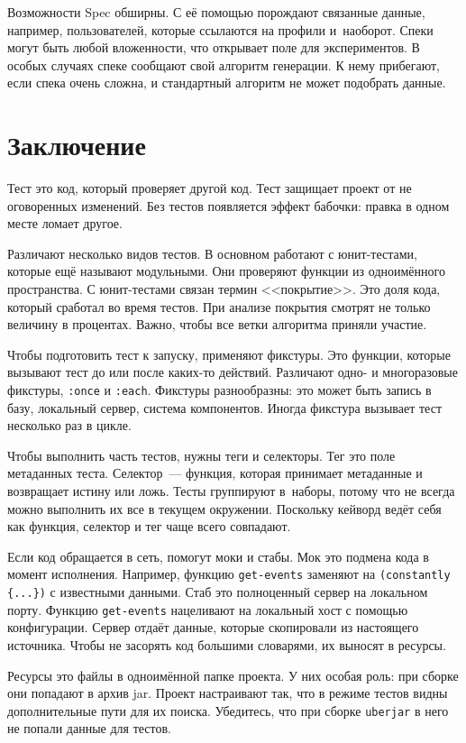 Возможности Spec обширны. С её помощью порождают связанные данные, например,
пользователей, которые ссылаются на профили и~наоборот. Спеки могут быть любой
вложенности, что открывает поле для экспериментов. В особых случаях спеке
сообщают свой алгоритм генерации. К нему прибегают, если спека очень сложна, и
стандартный алгоритм не может подобрать данные.

\section{Заключение}

Тест это код, который проверяет другой код. Тест защищает проект от не
оговоренных изменений. Без тестов появляется эффект бабочки: правка в одном
месте ломает другое.


Различают несколько видов тестов. В основном работают с юнит-тестами, которые
ещё называют модульными. Они проверяют функции из одноимённого пространства. С
юнит-тестами связан термин <<покрытие>>. Это доля кода, который сработал во
время тестов. При анализе покрытия смотрят не только величину в
процентах. Важно, чтобы все ветки алгоритма приняли участие.

Чтобы подготовить тест к запуску, применяют фикстуры. Это функции, которые
вызывают тест до или после каких-то действий. Различают одно- и многоразовые
фикстуры, \verb|:once| и \verb|:each|. Фикстуры разнообразны: это может быть
запись в базу, локальный сервер, система компонентов. Иногда фикстура вызывает
тест несколько раз в цикле.

Чтобы выполнить часть тестов, нужны теги и селекторы. Тег это поле метаданных
теста. Селектор~--- функция, которая принимает метаданные и возвращает истину
или ложь. Тесты группируют в~наборы, потому что не всегда можно выполнить их все
в текущем окружении. Поскольку кейворд ведёт себя как функция, селектор и
тег чаще всего совпадают.

Если код обращается в сеть, помогут моки и стабы. Мок это подмена кода в момент
исполнения. Например, функцию \verb|get-events| заменяют на
\verb|(constantly {...})| с известными данными. Стаб это полноценный сервер на
локальном порту. Функцию \verb|get-events| нацеливают на локальный хост с
помощью конфигурации. Сервер отдаёт данные, которые скопировали из настоящего
источника. Чтобы не засорять код большими словарями, их выносят в ресурсы.

Ресурсы это файлы в одноимённой папке проекта. У них особая роль: при сборке они
попадают в архив jar. Проект настраивают так, что в режиме тестов видны
дополнительные пути для их поиска. Убедитесь, что при сборке \verb|uberjar| в
него не попали данные для тестов.

